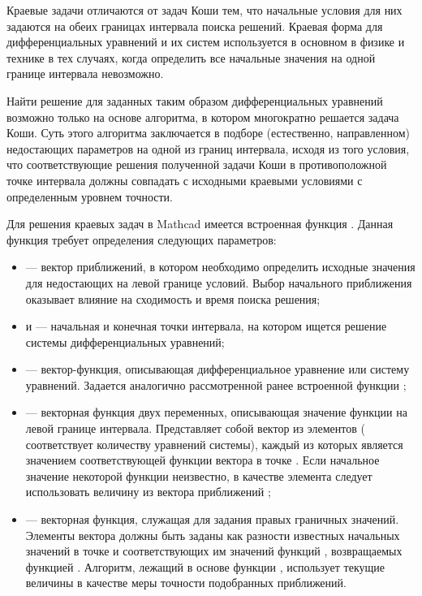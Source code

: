 Краевые задачи отличаются от задач Коши тем, что начальные условия для них задаются на обеих границах интервала поиска решений. Краевая форма для дифференциальных уравнений и их систем используется в основном в физике и технике в тех случаях, когда определить все начальные значения на одной границе интервала невозможно. 

Найти решение для заданных таким образом дифференциальных уравнений возможно только на основе алгоритма, в котором многократно решается задача Коши. Суть этого алгоритма заключается в подборе (естественно, направленном) недостающих параметров на одной из границ интервала, исходя из того условия, что соответствующие решения полученной задачи Коши в противоположной точке интервала должны совпадать с исходными краевыми условиями с определенным уровнем точности.

Для решения краевых задач в Mathcad имеется встроенная функция . Данная функция требует определения следующих параметров:
\begin{itemize}[label={}]
	\item {} --- вектор приближений, в котором необходимо определить исходные значения для недостающих на левой границе условий. Выбор начального приближения оказывает влияние на сходимость и время поиска решения;
	\item {} и  --- начальная и конечная точки интервала, на котором ищется решение системы дифференциальных уравнений;
	\item {} --- вектор-функция, описывающая дифференциальное уравнение или систему уравнений. Задается аналогично рассмотренной ранее встроенной функции ;
	\item {} --- векторная функция двух переменных, описывающая значение функции на левой границе интервала. Представляет собой вектор из  элементов ( соответствует количеству уравнений системы), каждый из которых является значением соответствующей функции вектора  в точке . Если начальное значение некоторой функции неизвестно, в качестве элемента  следует использовать величину из вектора приближений ;
	\item {} --- векторная функция, служащая для задания правых граничных значений. Элементы вектора  должны быть заданы как разности известных начальных значений в точке  и соответствующих им значений функций , возвращаемых функцией . Алгоритм, лежащий в основе функции , использует текущие величины  в качестве меры точности подобранных приближений. 
\end{itemize}

